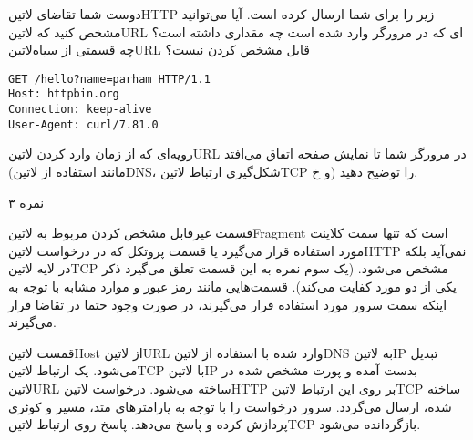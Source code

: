 \documentclass[../main.tex]{subfiles}
\begin{document}

دوست شما تقاضای ‌لاتین{HTTP} زیر را برای شما ارسال کرده است.
آیا می‌توانید مشخص کنید که ‌لاتین{URL} ای که در مرورگر وارد شده است چه مقداری داشته است؟
چه قسمتی از ‌سیاه{‌لاتین{URL}} قابل مشخص کردن نیست؟

\begin{latin}
\begin{verbatim}
GET /hello?name=parham HTTP/1.1
Host: httpbin.org
Connection: keep-alive
User-Agent: curl/7.81.0
\end{verbatim}
\end{latin}

رویه‌ای که از زمان وارد کردن ‌لاتین{URL} در مرورگر شما تا نمایش صفحه اتفاق می‌افتد (مانند استفاده از ‌لاتین{DNS}، شکل‌گیری ارتباط ‌لاتین{TCP} و ‌خ) را توضیح دهید.

۳ نمره

\begin{answer}

قسمت غیرقابل مشخص کردن مربوط به ‌لاتین{Fragment} است که تنها سمت کلاینت مورد استفاده قرار می‌گیرد
یا قسمت پروتکل که در درخواست ‌لاتین{HTTP} نمی‌آید بلکه در لایه ‌لاتین{TCP} مشخص می‌شود.
(یک سوم نمره به این قسمت تعلق می‌گیرد ذکر یکی از دو مورد کفایت می‌کند).
قسمت‌هایی مانند رمز عبور و موارد مشابه با توجه به اینکه سمت سرور مورد استفاده قرار می‌گیرند، در صورت وجود حتما در تقاضا قرار می‌گیرند.

 قمست ‌لاتین{Host} از ‌لاتین{URL} وارد شده با استفاده از ‌لاتین{DNS} به ‌لاتین{IP} تبدیل می‌شود.
 یک ارتباط ‌لاتین{TCP} با ‌لاتین{IP} بدست آمده و پورت مشخص شده در ‌لاتین{URL} ساخته می‌شود.
 درخواست ‌لاتین{HTTP} بر روی این ارتباط ‌لاتین{TCP} ساخته شده، ارسال می‌گردد.
 سرور درخواست را با توجه به پارامترهای متد، مسیر و کوئری پردازش کرده و پاسخ می‌دهد.
 پاسخ روی ارتباط ‌لاتین{TCP} بازگردانده می‌شود.

\end{answer}
\end{document}
